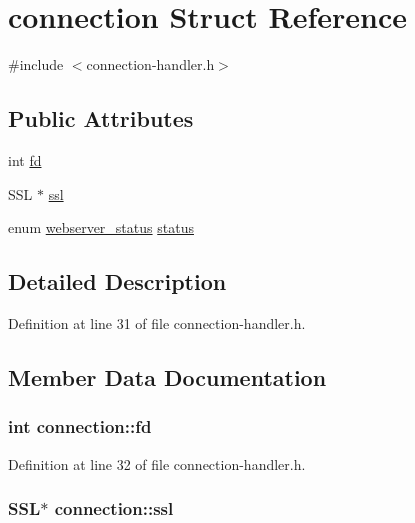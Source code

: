 \hypertarget{structconnection}{\section{connection Struct Reference}
\label{structconnection}
}


{\ttfamily \#include $<$connection-\/handler.\-h$>$}

\subsection*{Public Attributes}
\begin{DoxyCompactItemize}
\item 
int \hyperlink{structconnection_aa9a96cc6c66ef5a617f51247b2809a40}{fd}
\item 
S\-S\-L $\ast$ \hyperlink{structconnection_abaf979296936dbc887ace4543cb4fec5}{ssl}
\item 
enum \hyperlink{webserver_8h_a4b078d99ed3d03303ca3ba56f4a18d09}{webserver\-\_\-status} \hyperlink{structconnection_a70afd7d3c892d86014a13a5af6ce65e1}{status}
\end{DoxyCompactItemize}


\subsection{Detailed Description}


Definition at line 31 of file connection-\/handler.\-h.



\subsection{Member Data Documentation}
\hypertarget{structconnection_aa9a96cc6c66ef5a617f51247b2809a40}{
\subsubsection[{fd}]{\setlength{\rightskip}{0pt plus 5cm}int connection\-::fd}}\label{structconnection_aa9a96cc6c66ef5a617f51247b2809a40}


Definition at line 32 of file connection-\/handler.\-h.

\hypertarget{structconnection_abaf979296936dbc887ace4543cb4fec5}{
\subsubsection[{ssl}]{\setlength{\rightskip}{0pt plus 5cm}S\-S\-L$\ast$ connection\-::ssl}}\label{structconnection_abaf979296936dbc887ace4543cb4fec5}


